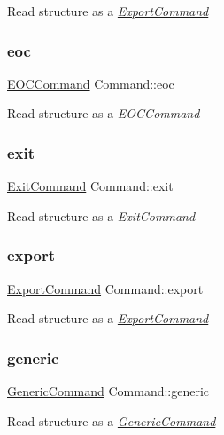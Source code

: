 Read structure as a {\itshape \hyperlink{structExportCommand}{Export\+Command}} \mbox{\label{unionCommand_a062a1645e04deb34460595c902a49c44}} 
\subsubsection{\texorpdfstring{eoc}{eoc}}
{\footnotesize\ttfamily \hyperlink{command_8h_ae5bf5cf7a34428c221f28179034dd125}{E\+O\+C\+Command} Command\+::eoc}

Read structure as a {\itshape E\+O\+C\+Command} \mbox{\label{unionCommand_ab516bde009e6b06c4b342d7f5bf35ece}} 
\subsubsection{\texorpdfstring{exit}{exit}}
{\footnotesize\ttfamily \hyperlink{command_8h_a354cb87bc40859e5595de56b675732bc}{Exit\+Command} Command\+::exit}

Read structure as a {\itshape Exit\+Command} \mbox{\label{unionCommand_a57e7a8eb0763aa7105d3bc6a52e59da3}} 
\subsubsection{\texorpdfstring{export}{export}}
{\footnotesize\ttfamily \hyperlink{structExportCommand}{Export\+Command} Command\+::export}

Read structure as a {\itshape \hyperlink{structExportCommand}{Export\+Command}} \mbox{\label{unionCommand_a22a7dad0e3935c261a1643c8c5ea46aa}} 
\subsubsection{\texorpdfstring{generic}{generic}}
{\footnotesize\ttfamily \hyperlink{structGenericCommand}{Generic\+Command} Command\+::generic}

Read structure as a {\itshape \hyperlink{structGenericCommand}{Generic\+Command}} \mbox{\label{unionCommand_abeb4905f11baf90a800fe211dd5ecdc9}} 

